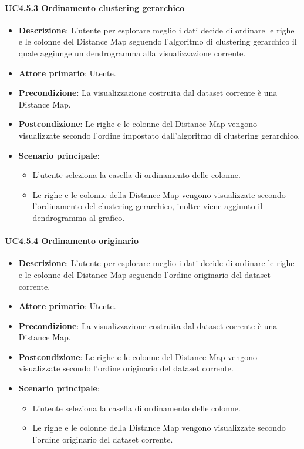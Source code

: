 \paragraph{UC4.5.3 Ordinamento clustering gerarchico}
\label{par:uc4.5.3}
\begin{itemize}
    \item \textbf{Descrizione}: L'utente per esplorare meglio i dati decide di ordinare le righe e le colonne del Distance Map seguendo l'algoritmo di clustering gerarchico il quale aggiunge un dendrogramma alla visualizzazione corrente.
    \item \textbf{Attore primario}: Utente.
    \item \textbf{Precondizione}: La visualizzazione costruita dal dataset corrente è una Distance Map.
    \item \textbf{Postcondizione}: Le righe e le colonne del Distance Map vengono visualizzate secondo l'ordine impostato dall'algoritmo di clustering gerarchico.
    \item \textbf{Scenario principale}: 
    \begin{itemize}
        \item L'utente seleziona la casella di ordinamento delle colonne.
        \item Le righe e le colonne della Distance Map vengono visualizzate secondo l'ordinamento del clustering gerarchico, inoltre viene aggiunto il dendrogramma al grafico.
    \end{itemize}
\end{itemize}

\paragraph{UC4.5.4 Ordinamento originario}
\label{par:uc4.5.4}
\begin{itemize}
    \item \textbf{Descrizione}: L'utente per esplorare meglio i dati decide di ordinare le righe e le colonne del Distance Map seguendo l'ordine originario del dataset corrente.
    \item \textbf{Attore primario}: Utente.
    \item \textbf{Precondizione}: La visualizzazione costruita dal dataset corrente è una Distance Map.
    \item \textbf{Postcondizione}: Le righe e le colonne del Distance Map vengono visualizzate secondo l'ordine originario del dataset corrente.
    \item \textbf{Scenario principale}: 
    \begin{itemize}
        \item L'utente seleziona la casella di ordinamento delle colonne.
        \item Le righe e le colonne della Distance Map vengono visualizzate secondo l'ordine originario del dataset corrente.
    \end{itemize}
\end{itemize}

